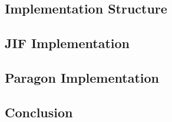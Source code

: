 \subsection{Implementation Structure}

\subsection{JIF Implementation}

\subsection{Paragon Implementation}

\subsection{Conclusion}
